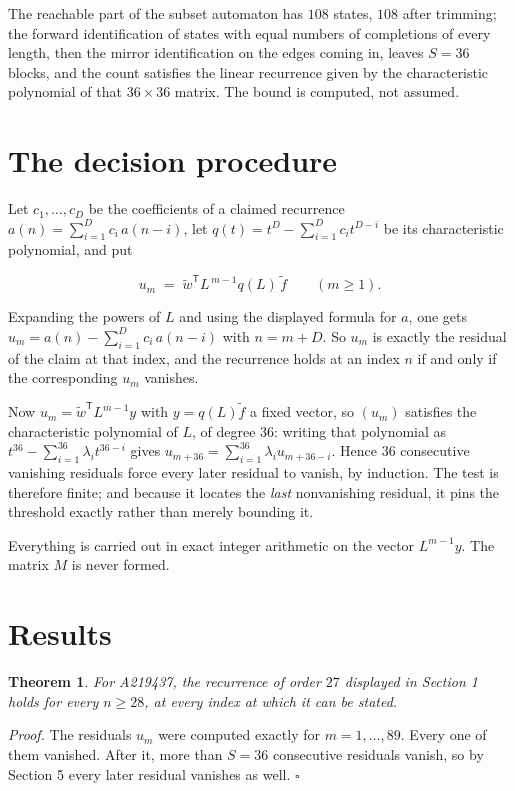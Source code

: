 \documentclass[11pt]{article}
\newtheorem{theorem}{Theorem}
\theoremstyle{definition}
\begin{document}
The reachable part of the subset automaton has $108$ states, $108$ after trimming; the forward identification of states with equal numbers of completions of every length, then the mirror identification on the edges coming in, leaves $S = 36$ blocks, and the count satisfies the linear recurrence given by the characteristic polynomial of that $36\times36$ matrix. The bound is computed, not assumed.

\section{The decision procedure}

Let $c_1,\dots,c_D$ be the coefficients of a claimed recurrence $a(n) = \sum_{i=1}^{D} c_i\,a(n-i)$, let $q(t) = t^{D} - \sum_{i=1}^{D} c_i t^{D-i}$ be its characteristic polynomial, and put

\[u_m \;=\; \tilde w^{\mathsf T} L^{\,m-1} q(L)\,\tilde f \qquad (m \ge 1).\]

Expanding the powers of $L$ and using the displayed formula for $a$, one gets $u_m = a(n) - \sum_{i=1}^{D} c_i\,a(n-i)$ with $n = m + D$. So $u_m$ is exactly the residual of the claim at that index, and the recurrence holds at an index $n$ if and only if the corresponding $u_m$ vanishes.

Now $u_m = \tilde w^{\mathsf T} L^{m-1} y$ with $y = q(L)\tilde f$ a fixed vector, so $(u_m)$ satisfies the characteristic polynomial of $L$, of degree $36$: writing that polynomial as $t^{36} - \sum_{i=1}^{36} \lambda_i t^{36-i}$ gives $u_{m+36} = \sum_{i=1}^{36} \lambda_i u_{m+36-i}$. Hence $36$ consecutive vanishing residuals force every later residual to vanish, by induction. The test is therefore finite; and because it locates the {\itshape last} nonvanishing residual, it pins the threshold exactly rather than merely bounding it.

Everything is carried out in exact integer arithmetic on the vector $L^{m-1}y$. The matrix $M$ is never formed.

\section{Results}

\begin{theorem} For A219437, the recurrence of order $27$ displayed in Section 1 holds for every $n \ge 28$, at every index at which it can be stated.\end{theorem}

{\itshape Proof.} The residuals $u_m$ were computed exactly for $m = 1,\dots,89$. Every one of them vanished. After it, more than $S = 36$ consecutive residuals vanish, so by Section 5 every later residual vanishes as well. $\square$
\end{document}
